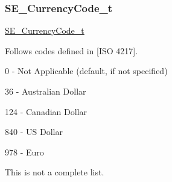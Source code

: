 \subsubsection{\texorpdfstring{S\+E\+\_\+\+Currency\+Code\+\_\+t}{SE\_CurrencyCode\_t}}
{\footnotesize\ttfamily \hyperlink{group__CurrencyCode_gadef02433fe757d7bd9fd0d9b59f690a0}{S\+E\+\_\+\+Currency\+Code\+\_\+t}}

Follows codes defined in \mbox{[}I\+SO 4217\mbox{]}.

0 -\/ Not Applicable (default, if not specified)

36 -\/ Australian Dollar

124 -\/ Canadian Dollar

840 -\/ US Dollar

978 -\/ Euro

This is not a complete list. 